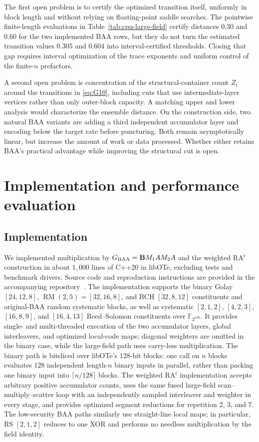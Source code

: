 \documentclass[runningheads,envcountsame,envcountsect]{llncs}
\newcommand{\F}{\mathbb F}
\begin{document}
The first open problem is to certify the optimized transition itself, uniformly
in block length and without relying on floating-point saddle searches.  The
pointwise finite-length evaluations in Table~\ref{tab:cpu-large-field} certify
distances $0.30$ and $0.60$ for the two implemented BAA rows, but they do not
turn the estimated transition values $0.305$ and $0.604$ into interval-certified
thresholds.  Closing that gap requires interval optimization of the trace
exponents and uniform control of the finite-$n$ prefactors.

A second open problem is concentration of the structural-container count $Z_t$
around the transitions in \eqref{eq:G10}, including cuts that use
intermediate-layer vertices rather than only outer-block capacity.  A matching
upper and lower analysis would characterize the ensemble distance.  On the
construction side, two natural BAA variants are adding a third independent
accumulator layer and encoding below the target rate before puncturing.  Both
remain asymptotically linear, but increase the amount of work or data processed.
Whether either retains BAA's practical advantage while improving the structural
cut is open.

\section{Implementation and performance evaluation}
\label{sec:implementation}

\subsection{Implementation}

We implemented multiplication by $G_{\rm BAA}=\mathbf B M_1AM_2A$ and the
weighted RA$^t$ construction in about $1{,}000$ lines of C++20 in libOTe, excluding
tests and benchmark drivers.  Source code and reproduction instructions are
provided in the accompanying repository~\cite{chosenbaaartifact}.  The
implementation supports the binary Golay $[24,12,8]$,
$\operatorname{RM}(2,5)=[32,16,8]$, and BCH $[32,8,12]$ constituents and
original-BAA random systematic blocks, as well as systematic $[2,1,2]$,
$[4,2,3]$, $[16,8,9]$, and $[16,4,13]$ Reed--Solomon constituents over
$\F_{2^{128}}$.  It provides single- and
multi-threaded execution of the two accumulator layers, global interleavers,
and optimized local-code maps; diagonal weighters are omitted in the binary
case, while the large-field path uses carry-less multiplication.  The binary
path is bitsliced over libOTe's $128$-bit blocks: one call on $n$ blocks
evaluates $128$ independent length-$n$ binary inputs in parallel, rather than
packing one binary input into $\lceil n/128\rceil$ blocks.
The weighted RA$^t$ implementation accepts arbitrary positive accumulator
counts, uses the same fused large-field scan--multiply--scatter loop with an
independently sampled interleaver and weighter in every stage, and provides
optimized segment reductions for repetition $2$, $3$, and $7$.
The low-security BAA paths similarly use straight-line local maps; in particular,
RS $[2,1,2]$ reduces to one XOR and performs no needless multiplication by the
field identity.
\end{document}
